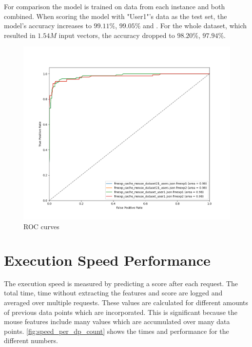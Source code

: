 \documentclass[
    fontsize=12pt,
    headings=small,
    parskip=half,           %
    bibliography=totoc,
    numbers=noenddot,       %
    open=any,               %
    final,                   %
    table
]{scrreprt}
\begin{document}
For comparison the model is trained on data from each instance and both combined. When scoring the model with "User1"'s data as the test set, the model's accuracy increases to $99.11\%$, $99.05\%$ and \todo. For the whole dataset, which resulted in $1.54M$ input vectors, the accuracy dropped to $98.20\%$, $97.94\%$.

\begin{figure}[h]
    \includegraphics[width=\textwidth]{figures/roc_both_datasets_both_instances.png}
    \caption{ROC curves}
    \label{fig:roc_both_datasets_both_instances}
\end{figure}


\section{Execution Speed Performance}

The execution speed is measured by predicting a score after each request. The total time, time without extracting the features and score are logged and averaged over multiple requests. These values are calculated for different amounts of previous data points which are incorporated. This is significant because the mouse features include many values which are accumulated over many data points. \ref{fig:speed_per_dp_count} shows the times and performance for the different numbers.
\end{document}
